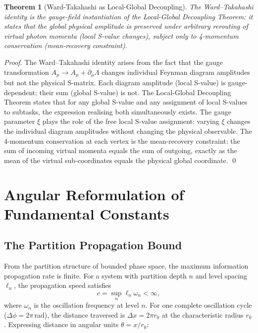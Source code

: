 \documentclass[twocolumn,10pt,a4paper]{article}
\theoremstyle{thmstyle}
\newtheorem{theorem}{Theorem}[section]
\theoremstyle{definition}
\theoremstyle{remark}
\begin{document}
\begin{theorem}[Ward-Takahashi as Local-Global Decoupling]
\label{thm:ward-takahashi}
The Ward--Takahashi identity is the gauge-field instantiation of
the Local-Global Decoupling Theorem: it states that the global
physical amplitude is preserved under arbitrary rerouting of
virtual photon momenta (local S-value changes), subject only to
4-momentum conservation (mean-recovery constraint).
\end{theorem}

\begin{proof}
The Ward--Takahashi identity arises from the fact that the gauge
transformation $A_\mu \to A_\mu + \partial_\mu \Lambda$ changes
individual Feynman diagram amplitudes but not the physical S-matrix.
Each diagram amplitude (local S-value) is gauge-dependent; their sum
(global S-value) is not. The Local-Global Decoupling Theorem states
that for any global S-value and any assignment of local S-values to
subtasks, the expression realising both simultaneously exists. The
gauge parameter $\xi$ plays the role of the free local S-value
assignment: varying $\xi$ changes the individual diagram amplitudes
without changing the physical observable. The 4-momentum conservation
at each vertex is the mean-recovery constraint: the sum of incoming
virtual momenta equals the sum of outgoing, exactly as the mean of
the virtual sub-coordinates equals the physical global coordinate. \qed
\end{proof}

\section{Angular Reformulation of Fundamental Constants}
\label{sec:constants}

\subsection{The Partition Propagation Bound}

From the partition structure of bounded phase space, the maximum
information propagation rate is finite. For a system with partition
depth $n$ and level spacing $\ell_n$, the propagation speed satisfies
\begin{equation}
c = \sup_n \ell_n \omega_n < \infty,
\end{equation}
where $\omega_n$ is the oscillation frequency at level $n$.
For one complete oscillation cycle ($\Delta\phi = 2\pi$\,rad), the
distance traversed is $\Delta x = 2\pi r_0$ at the characteristic
radius $r_0$. Expressing distance in angular units $\theta = x/r_0$:
\end{document}
